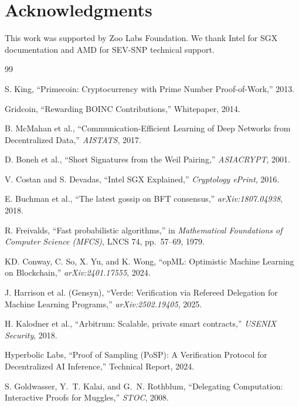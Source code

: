 \section*{Acknowledgments}


This work was supported by Zoo Labs Foundation. We thank Intel for SGX documentation and AMD for SEV-SNP technical support.


\begin{thebibliography}{99}

S. King, ``Primecoin: Cryptocurrency with Prime Number Proof-of-Work,'' 2013.

Gridcoin, ``Rewarding BOINC Contributions,'' Whitepaper, 2014.

B. McMahan et al., ``Communication-Efficient Learning of Deep Networks from Decentralized Data,'' \textit{AISTATS}, 2017.

D. Boneh et al., ``Short Signatures from the Weil Pairing,'' \textit{ASIACRYPT}, 2001.

V. Costan and S. Devadas, ``Intel SGX Explained,'' \textit{Cryptology ePrint}, 2016.

E. Buchman et al., ``The latest gossip on BFT consensus,'' \textit{arXiv:1807.04938}, 2018.

R. Freivalds, ``Fast probabilistic algorithms,'' in \textit{Mathematical Foundations of Computer Science (MFCS)}, LNCS 74, pp.\ 57--69, 1979.

KD. Conway, C. So, X. Yu, and K. Wong, ``opML: Optimistic Machine Learning on Blockchain,'' \textit{arXiv:2401.17555}, 2024.

J. Harrison et al. (Gensyn), ``Verde: Verification via Refereed Delegation for Machine Learning Programs,'' \textit{arXiv:2502.19405}, 2025.

H. Kalodner et al., ``Arbitrum: Scalable, private smart contracts,'' \textit{USENIX Security}, 2018.

Hyperbolic Labs, ``Proof of Sampling (PoSP): A Verification Protocol for Decentralized AI Inference,'' Technical Report, 2024.

S. Goldwasser, Y.~T. Kalai, and G.~N. Rothblum, ``Delegating Computation: Interactive Proofs for Muggles,'' \textit{STOC}, 2008.


\end{thebibliography}
